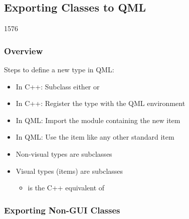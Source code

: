 %
%
%
%

\subsection{Exporting Classes to QML}

\begin{slide}{1576}\frametitle{Overview}

Steps to define a new type in QML:

\begin{itemize}
\item In C++: Subclass either  or 
\item In C++: Register the type with the QML environment
\item In QML: Import the module containing the new item
\item In QML: Use the item like any other standard item
\end{itemize}

\vspace*{0.5em}
\begin{itemize}
\item Non-visual types are  subclasses
\item Visual types (items) are  subclasses
  \begin{itemize}
  \item {} is the C++ equivalent of 
  \end{itemize}
\end{itemize}

\end{slide}


\subsubsection{Exporting Non-GUI Classes}

